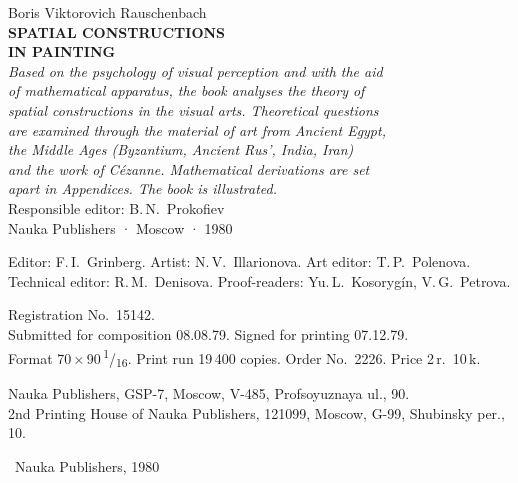 \thispagestyle{empty}
\vspace*{3em}
\begin{center}
  {\large Boris Viktorovich Rauschenbach}\\[2em]
  {\LARGE\bfseries SPATIAL CONSTRUCTIONS\\[0.4em] IN PAINTING}\\[3em]
  {\normalsize\itshape
    Based on the psychology of visual perception and with the aid\\
    of mathematical apparatus, the book analyses the theory of\\
    spatial constructions in the visual arts. Theoretical questions\\
    are examined through the material of art from Ancient Egypt,\\
    the Middle Ages (Byzantium, Ancient Rus\kern0pt', India, Iran)\\
    and the work of Cézanne. Mathematical derivations are set\\
    apart in Appendices. The book is illustrated.}\\[3em]
  {\normalsize Responsible editor: B.\,N.~Prokofiev}\\[4em]
  \vfill
  {\normalsize Nauka Publishers · Moscow · 1980}
\end{center}
\clearpage

\thispagestyle{empty}
\vspace*{\fill}
\noindent
{\small
Editor: F.\,I.~Grinberg. \quad
Artist: N.\,V.~Illarionova. \quad
Art editor: T.\,P.~Polenova.\\
Technical editor: R.\,M.~Denisova. \quad
Proof-readers: Yu.\,L.~Kosorygín, V.\,G.~Petrova.

\medskip\noindent
Registration No.~15142.\\
Submitted for composition 08.08.79. Signed for printing 07.12.79.\\
Format 70\,×\,90\,\textsuperscript{1}/\textsubscript{16}.
Print run 19\,400 copies. Order No.~2226. Price 2\,r.\ 10\,k.

\medskip\noindent
Nauka Publishers, GSP-7, Moscow, V-485, Profsoyuznaya ul., 90.\\
2nd Printing House of Nauka Publishers, 121099, Moscow, G-99,
Shubinsky per., 10.

\bigskip\noindent
\textcopyright\ Nauka Publishers, 1980
}
\vspace*{\fill}
\clearpage


